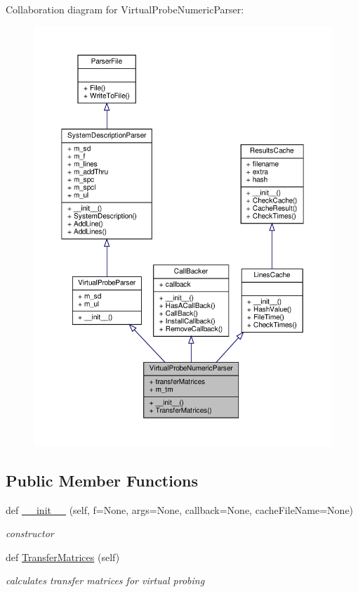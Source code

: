 Collaboration diagram for Virtual\+Probe\+Numeric\+Parser\+:\nopagebreak
\begin{figure}[H]
\begin{center}
\leavevmode
\includegraphics[width=350pt]{classSignalIntegrity_1_1Parsers_1_1VirtualProbeNumericParser_1_1VirtualProbeNumericParser__coll__graph}
\end{center}
\end{figure}
\subsection*{Public Member Functions}
\begin{DoxyCompactItemize}
\item 
def \hyperlink{classSignalIntegrity_1_1Parsers_1_1VirtualProbeNumericParser_1_1VirtualProbeNumericParser_a5ce77900c33ce9b681aebb5c527ab92a}{\+\_\+\+\_\+init\+\_\+\+\_\+} (self, f=None, args=None, callback=None, cache\+File\+Name=None)
\begin{DoxyCompactList}\small\item\em constructor \end{DoxyCompactList}\item 
def \hyperlink{classSignalIntegrity_1_1Parsers_1_1VirtualProbeNumericParser_1_1VirtualProbeNumericParser_a836e87421e9e21a6676da06625b644b1}{Transfer\+Matrices} (self)
\begin{DoxyCompactList}\small\item\em calculates transfer matrices for virtual probing \end{DoxyCompactList}\end{DoxyCompactItemize}


